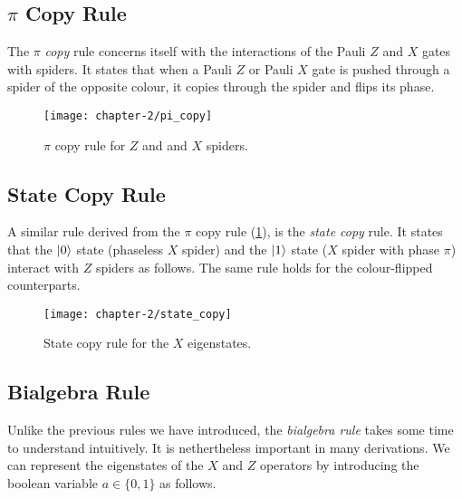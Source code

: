 

\subsection{$\pi$ Copy Rule}%

The $\pi$ \textit{copy} rule concerns itself with the interactions of the Pauli $Z$ and $X$ gates with spiders. It states that when a Pauli $Z$ or Pauli $X$ gate is pushed through a spider of the opposite colour, it copies through the spider and flips its phase.

\begin{figure}[H]
    \centering
    \texttt{[image: chapter-2/pi\_copy]}
    \caption{$\pi$ copy rule for $Z$ and and $X$ spiders.}
    \label{pi-copy}
\end{figure}


\subsection{State Copy Rule}%

A similar rule derived from the $\pi$ copy rule (\ref{pi-copy}), is the \textit{state copy} rule. It states that the $\ket 0$ state (phaseless $X$ spider) and the $\ket 1$ state ($X$ spider with phase $\pi$) interact with $Z$ spiders as follows. The same rule holds for the colour-flipped counterparts.

\begin{figure}[H]
    \centering
    \texttt{[image: chapter-2/state\_copy]}
    \caption{State copy rule for the $X$ eigenstates.}
    \label{state-copy}
\end{figure}


\subsection{Bialgebra Rule}%
Unlike the previous rules we have introduced, the \textit{bialgebra rule} takes some time to understand intuitively. It is nethertheless important in many derivations. We can represent the eigenstates of the $X$ and $Z$ operators by introducing the boolean variable $a \in \{0, 1\}$ as follows.

